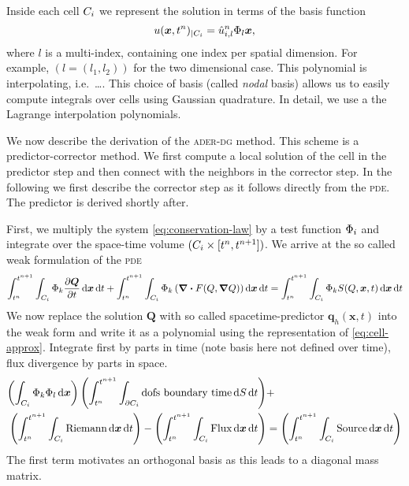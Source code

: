 Inside each cell $C_{i}$ we represent the solution in terms of the basis function 
\begin{equation}
  \label{eq:cell-approx}
  u(\bm{x}, t^n)_{|\cell[i]} = \hat{u}^n_{i,l} \sbasis{l}{\bm{x}},
\end{equation}
where $l$ is a multi-index, containing one index per spatial dimension.
For example, $(l = (l_1, l_2))$ for the two dimensional case.
This polynomial is interpolating, i.e.\ \ldots{}.
This choice of basis (called \textit{nodal} basis) allows us to easily compute integrals over cells using Gaussian quadrature.
In detail, we use a the Lagrange interpolation polynomials.

We now describe the derivation of the \textsc{ader-dg} method.
This scheme is a predictor-corrector method.
We first compute a local solution of the cell in the predictor step and then connect with the neighbors in the corrector step.
In the following we first describe the corrector step as it follows directly from the \textsc{pde}.
The predictor is derived shortly after.

First, we multiply the system \cref{eq:conservation-law} by a test function $\Phi_{i}$ and integrate over the space-time volume $(C_{i} \times [t^n, t^{n+1}])$.
We arrive at the so called weak formulation of the \textsc{pde} 
\newcommand{\intdt}[1]{\int_{t^n}^{t^{n+1}} #1 \dd{t}}
\newcommand{\intdcell}[1]{\int_{\cell} #1 \dd{\bm{x}}}
\newcommand{\intdcellb}[1]{\int_{\partial{} \cell} #1 \dd{S}} %
\begin{equation}
  \label{eq:weak-pde}
\intdt{\intdcell{
\testfunction{k} \pdv{\bm{Q}}{t}
}}
+
\intdt{\intdcell{
    \testfunction{k} \left( \div{F(Q, \gradient{Q})} \right)
}}
=
\intdt{\intdcell{
    \testfunction{k} S(Q, \bm{x}, t)
}}
\end{equation}
\newcommand{\stpredictor}[1]{\bm{q}_{#1}}
We now replace the solution $\bm{Q}$ with so called spacetime-predictor $\stpredictor{h}(\bm{x},t)$ into the weak form and write it as a polynomial using the representation of \cref{eq:cell-approx}.
Integrate first by parts in time (note basis here not defined over time), flux divergence by parts in space.
\begin{align}
\begin{split}
\label{eq:corrector}
\left(
\intdcell{
  \testfunction{k} \sbasis{l}
}
\right)
\left(\intdt{\intdcellb{
\text{dofs boundary time}
}}\right)
&+\\
\left(\intdt{\intdcell{
\text{Riemann}
}}\right)
-
\left(\intdt{\intdcell{
\text{Flux}
}}\right)
&=
\left(\intdt{\intdcell{
  \text{Source}
}}\right)
\end{split}
\end{align}
The first term motivates an orthogonal basis as this leads to a diagonal mass matrix.


